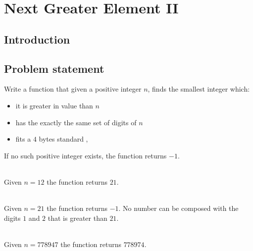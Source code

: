 %



\chapter{Next Greater Element \RN{2}}
\label{ch:next_greater_element_2}
\section*{Introduction}

\section{Problem statement}
\begin{exercise}
\label{example:next_greater_element_2:exercice1}
Write a function that  given a positive integer $n$, 
finds the smallest integer which:
\begin{itemize}
	\item it is greater in value than $n$
	\item has the exactly the same set of digits of $n$
	\item fits a $4$ bytes standard ,
\end{itemize} 
If no such positive integer exists, the function returns $-1$.
 
	\begin{example}
		\label{example:next_greater_element_2:example1}
		\hfill \\
		Given $n=12$ the function returns $21$.
	\end{example}

	\begin{example}
		\label{example:next_greater_element_2:example2}
		\hfill \\
		Given $n=21$ the function returns $-1$. No number can be composed with the digits $1$ and $2$ that 
		is greater than $21$.
	\end{example}

	\begin{example}
		\hfill \\
		Given $n = 778947$ the function returns $778974$.
	\label{ex:next_greater_element_2:example3}
	\end{example}
\end{exercise}

